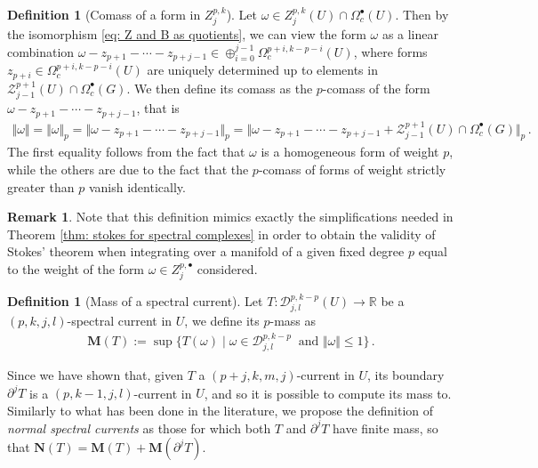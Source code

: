 \documentclass[dvipsnames]{amsart}
\theoremstyle{definition}
\newtheorem{definition}[theorem]{Definition}
\newtheorem{remark}[theorem]{Remark}
\theoremstyle{definition}
\numberwithin{equation}{section}
\newcommand{\R}{\mathbb{R}}
\begin{document}
\begin{definition}[Comass of a form in $Z_j^{p,k}$]
    Let $\omega\in Z_j^{p,k}(U)\cap\Omega^{\bullet}_c(U)$. Then by the isomorphism \ref{eq: Z and B as quotients}, we can view the form $\omega$ as a linear combination $\omega-z_{p+1}-\cdots-z_{p+j-1}\in\oplus_{i=0}^{j-1}\Omega^{p+i,k-p-i}_c(U)$, where forms $z_{p+i}\in\Omega^{p+i,k-p-i}_c(U)$ are uniquely determined up to elements in $\mathcal{Z}_{j-1}^{p+1}(U)\cap\Omega_c^{\bullet}(G)$. We then define its comass as the $p$-comass of the form $\omega-z_{p+1}-\cdots-z_{p+j-1}$, that is
    \begin{align*}
        \Vert\omega\Vert=\Vert\omega\Vert_p=\Vert \omega-z_{p+1}-\cdots-z_{p+j-1}\Vert_p=\Vert \omega-z_{p+1}-\cdots-z_{p+j-1}+\mathcal{Z}_{j-1}^{p+1}(U)\cap\Omega_c^{\bullet}(G)\Vert_p\,.
    \end{align*}
    The first equality follows from the fact that $\omega$ is a homogeneous form of weight $p$, while the others are due to the fact that the $p$-comass of forms of weight strictly greater than $p$ vanish identically.
\end{definition}
\begin{remark}
    Note that this definition mimics exactly the simplifications needed in Theorem \ref{thm: stokes for spectral complexes} in order to obtain the validity of Stokes' theorem when integrating over a manifold of a given fixed degree $p$ equal to the weight of the form $\omega\in Z_j^{p,\bullet}$ considered.
\end{remark}

\begin{definition}[Mass of a spectral current]
    Let $T\colon \mathscr D_{j,l}^{p,k-p}(U)\longrightarrow\R$ be a $(p,k,j,l)$-spectral current in $U$, we define its $p$-mass as
    \begin{align*}
        \mathbf{M}(T):=\sup\{T(\omega)\mid \omega\in\mathscr D_{j,l}^{p,k-p}\ \text{ and }\Vert\omega\Vert\le 1\}\,.
    \end{align*}
\end{definition}

Since we have shown that, given $T$ a $(p+j,k,m,j)$-current in $U$, its boundary $\partial^jT$ is a $(p,k-1,j,l)$-current in $U$, and so it is possible to compute its mass to. Similarly to what has been done in the literature, we propose the definition of \textit{normal spectral currents} as those for which both $T$ and $\partial^j T$ have finite mass, so that $\mathbf{N}(T)=\mathbf{M}(T)+\mathbf{M}(\partial^j T)$.




\bigskip


\end{document}
